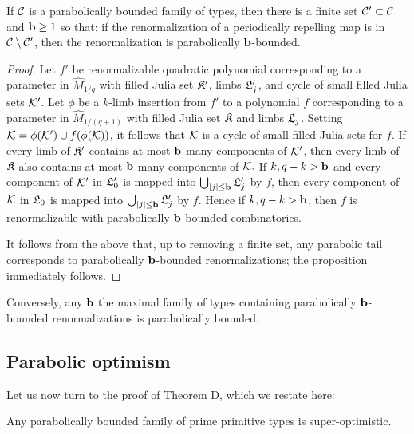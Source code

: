 \documentclass[12pt]{amsart}
\begin{document}
\begin{prop}\label{prop:parabolically bounded combinatorics}
	If $\mathcal C$ is a parabolically bounded family of types, then there is a finite set $\mathcal C'\subset \mathcal C$ and $\mathbf b\geq 1$ so that: if the renormalization of a periodically repelling  \pql map is in $\mathcal C\setminus \mathcal C'$, then the renormalization is parabolically $\mathbf b$-bounded.
\end{prop}

\begin{proof}
	Let $f'$  be renormalizable quadratic polynomial corresponding to a parameter in $\hat{M}_{1/q}$ 
	with filled Julia set $\mathfrak{K}'$, limbs $\mathfrak{L}_j'$, and cycle of small filled Julia sets $\mathcal K'$. 
	Let $\phi$ be a $k$-limb insertion from $f'$ to a polynomial $f$ corresponding to a parameter in $\hat{M}_{1/(q+1)}$ with filled Julia set $\mathfrak{K}$ and limbs $\mathfrak{L}_j$. Setting $\mathcal K = \phi(\mathcal K')\cup f(\phi(\mathcal K))$, it follows that $\mathcal K$ is a cycle of small filled Julia sets for $f$. If every limb of $\mathfrak{K}'$ contains at most $\mathbf b$ many components of $\mathcal K'$, then every limb of $\mathfrak{K}$ also contains at most $\mathbf b$ many components of $\mathcal K.$ If $k, q-k> \mathbf b$ and every component of $\mathcal K'$ in $\mathfrak{L}_0'$ is mapped into $\bigcup_{|j|\leq \mathbf b}\mathfrak{L}_j'$ by $f$, then every component of $\mathcal K$ in $\mathfrak{L}_0$ is mapped into $\bigcup_{|j|\leq \mathbf b}\mathfrak{L}_j'$ by $f$.
	 Hence if $k, q-k>\mathbf b$, then $f$ is renormalizable with parabolically $\mathbf b$-bounded combinatorics. 
	
	It follows from the above that, up to removing a finite set, any parabolic tail corresponds to parabolically $\mathbf b$-bounded renormalizations; the proposition immediately follows.
\end{proof}

\begin{rem}
	Conversely, any $\mathbf b$ the maximal family of types containing parabolically $\mathbf b$-bounded renormalizations is parabolically bounded.
\end{rem}


\subsection{Parabolic optimism}\label{sec:parabolic optimism}




Let us now turn to the proof of Theorem D, which we restate here:
\begin{thmD}
	Any parabolically bounded family of prime primitive types is super-optimistic.
\end{thmD}
\end{document}
